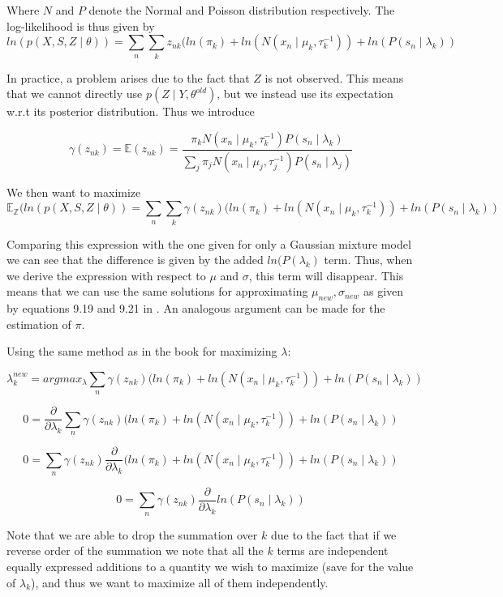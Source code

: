 \documentclass[11pt,a4paper]{article}
\begin{document}
Where $N$ and $P$ denote the Normal and Poisson distribution respectively. The log-likelihood is thus given by
$$ln(p(X, S, Z \mid \theta)) = \sum_{n} \sum_{k} z_{nk}(ln(\pi_{k}) + ln(N(x_{n} \mid \mu_{k}, \tau_{k}^{-1})) + ln(P(s_{n} \mid \lambda_{k})) $$

In practice, a problem arises due to the fact that $Z$ is not observed. This means that we cannot directly use $p(Z \mid Y, \theta^{old})$, but we instead use its expectation w.r.t its posterior distribution. Thus we introduce 

$$\gamma(z_{nk}) = \mathbb{E}(z_{nk}) = \frac{\pi_{k}N(x_{n} \mid \mu_{k}, \tau_{k}^{-1})P(s_{n} \mid \lambda_{k})}{\sum_{j}\pi_{j}N(x_{n} \mid \mu_{j}, \tau_{j}^{-1})P(s_{n} \mid \lambda_{j})}$$

We then want to maximize $$ \mathbb{E_{Z}}(ln(p(X, S, Z \mid \theta)) = \sum_{n} \sum_{k}\gamma(z_{nk})(ln(\pi_{k}) + ln(N(x_{n} \mid \mu_{k}, \tau_{k}^{-1})) + ln(P(s_{n} \mid \lambda_{k}))$$

Comparing this expression with the one given for only a Gaussian mixture model we can see that the difference is given by the added $ln(P(\lambda_{k})$ term. Thus, when we derive the expression with respect to $\mu$ and $\sigma$, this term will disappear. This means that we can use the same solutions for approximating $\mu_{new}, \sigma_{new}$ as given by equations 9.19 and 9.21 in \cite{book}. An analogous argument can be made for the estimation of $\pi$.

Using the same method as in the book for maximizing $\lambda$:


$$ \lambda_{k}^{new} =argmax_{\lambda} \sum_{n} \gamma(z_{nk})(ln(\pi_{k}) + ln(N(x_{n} \mid \mu_{k}, \tau_{k}^{-1})) + ln(P(s_{n} \mid \lambda_{k}))$$

$$ 0 = \frac{\partial}{\partial \lambda_{k}}\sum_{n} \gamma(z_{nk})(ln(\pi_{k}) + ln(N(x_{n} \mid \mu_{k}, \tau_{k}^{-1})) + ln(P(s_{n} \mid \lambda_{k}))$$

$$ 0 = \sum_{n} \gamma(z_{nk})\frac{\partial}{\partial \lambda_{k}}(ln(\pi_{k}) + ln(N(x_{n} \mid \mu_{k}, \tau_{k}^{-1})) + ln(P(s_{n} \mid \lambda_{k}))$$

$$ 0 = \sum_{n} \gamma(z_{nk})\frac{\partial}{\partial \lambda_{k}}ln(P(s_{n} \mid \lambda_{k}))$$

Note that we are able to drop the summation over $k$ due to the fact that if we reverse order of the summation we note that all the $k$ terms are independent equally expressed additions to a quantity we wish to maximize (save for the value of $\lambda_{k}$), and thus we want to maximize all of them independently.\\
\end{document}
